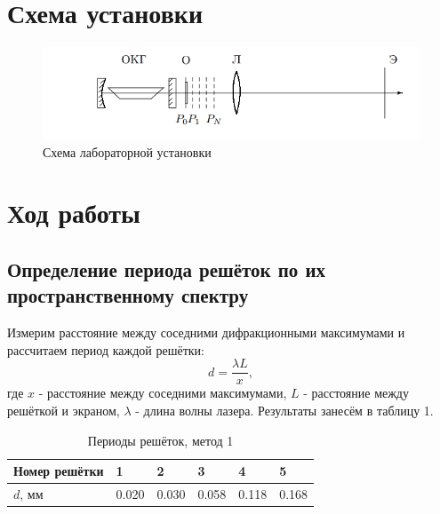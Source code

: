 \documentclass[a4paper]{article}
\begin{document}
\section{Схема установки}

    \begin{figure}[h]
    \centering
    \includegraphics[width=15cm]{fig2.PNG}
    \caption{Схема лабораторной установки}
    \label{fig:vac}
\end{figure}

\section{Ход работы}

\subsection{Определение периода решёток по их пространственному спектру}

Измерим расстояние между соседними дифракционными максимумами и рассчитаем период каждой решётки:
    \begin{equation}
        d = \frac{\lambda L}{x},
    \end{equation}
    где $x$ - расстояние между соседними максимумами, $L$ - расстояние между решёткой и экраном, $\lambda$ - длина волны лазера. Результаты занесём в таблицу 1.

    \begin{table}[h]
    \centering
    \begin{center}
    \caption{Периоды решёток, метод 1}
    \end{center}
    \vspace{0.1cm}
    \label{tab:my_label}
    \begin{tabular}{ |p{2.5cm}||p{0.7cm}|p{0.7cm}|p{0.7cm}|p{0.7cm}|p{0.7cm}|}
 \hline
Номер решётки & 1 & 2 & 3 & 4 & 5\\
 \hline
 $d$, мм & 0.020 & 0.030 & 0.058 & 0.118 & 0.168\\

 \hline
 
\end{tabular}
\end{table}
    
\end{document}
